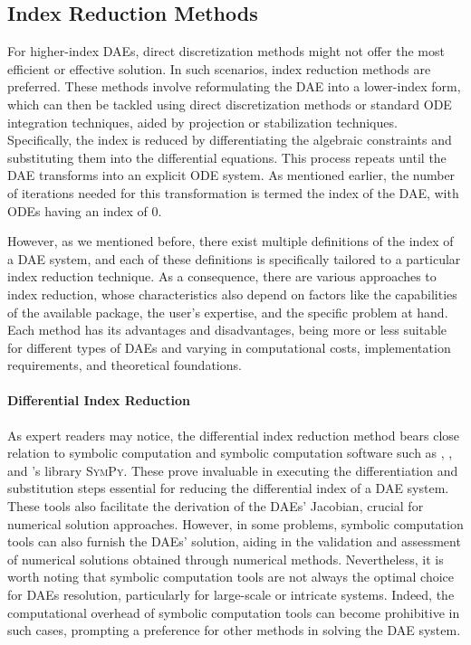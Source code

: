 \subsection{Index Reduction Methods}
\label{chap1:sec:index_reduction_methods}

For higher-index \acp{DAE}, direct discretization methods might not offer the most efficient or effective solution. In such scenarios, index reduction methods are preferred. These methods involve reformulating the \ac{DAE} into a lower-index form, which can then be tackled using direct discretization methods or standard \ac{ODE} integration techniques, aided by projection or stabilization techniques. Specifically, the index is reduced by differentiating the algebraic constraints and substituting them into the differential equations. This process repeats until the \ac{DAE} transforms into an explicit \ac{ODE} system. As mentioned earlier, the number of iterations needed for this transformation is termed the index of the \ac{DAE}, with \acp{ODE} having an index of 0.

However, as we mentioned before, there exist multiple definitions of the index of a \ac{DAE} system, and each of these definitions is specifically tailored to a particular index reduction technique. As a consequence, there are various approaches to index reduction, whose characteristics also depend on factors like the capabilities of the available package, the user's expertise, and the specific problem at hand. Each method has its advantages and disadvantages, being more or less suitable for different types of \acp{DAE} and varying in computational costs, implementation requirements, and theoretical foundations.

\paragraph{Differential Index Reduction}

As expert readers may notice, the differential index reduction method bears close relation to symbolic computation and symbolic computation software such as \Maple{}, \Mathematica{}, and \Python{}'s library \textsc{SymPy}. These prove invaluable in executing the differentiation and substitution steps essential for reducing the differential index of a \ac{DAE} system. These tools also facilitate the derivation of the \acp{DAE}' Jacobian, crucial for numerical solution approaches. However, in some problems, symbolic computation tools can also furnish the \acp{DAE}' solution, aiding in the validation and assessment of numerical solutions obtained through numerical methods. Nevertheless, it is worth noting that symbolic computation tools are not always the optimal choice for \acp{DAE} resolution, particularly for large-scale or intricate systems. Indeed, the computational overhead of symbolic computation tools can become prohibitive in such cases, prompting a preference for other methods in solving the \ac{DAE} system.

